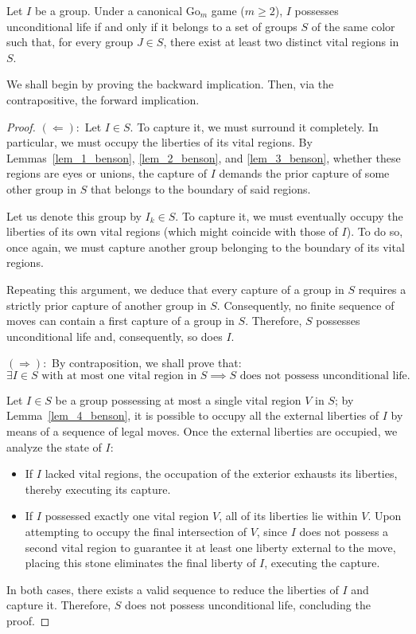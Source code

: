 \begin{theorem}\label{teo_benson}
	Let \(I\) be a group. Under a canonical \(\mathrm{Go}_{m}\) game (\(m \geq 2\)), \(I\) possesses unconditional life if and only if it belongs to a set of groups \(S\) of the same color such that, for every group \(J \in S\), there exist at least two distinct vital regions in \(S\).
\end{theorem}
We shall begin by proving the backward implication. Then, via the contrapositive, the forward implication.
\begin{proof}
	\((\Leftarrow):\) Let \(I\in S\). To capture it, we must surround it completely. In particular, we must occupy the liberties of its vital regions. By Lemmas~\ref{lem_1_benson}, \ref{lem_2_benson}, and \ref{lem_3_benson}, whether these regions are eyes or unions, the capture of \(I\) demands the prior capture of some other group in \(S\) that belongs to the boundary of said regions.
	
	Let us denote this group by \(I_k \in S\). To capture it, we must eventually occupy the liberties of its own vital regions (which might coincide with those of \(I\)). To do so, once again, we must capture another group belonging to the boundary of its vital regions.
	
	Repeating this argument, we deduce that every capture of a group in \(S\) requires a strictly prior capture of another group in \(S\). Consequently, no finite sequence of moves can contain a first capture of a group in \(S\). Therefore, \(S\) possesses unconditional life and, consequently, so does \(I\).

	
	\((\Rightarrow):\) By contraposition, we shall prove that:
	$$\exists I \in S \text{ with at most one vital region in } S \implies S \text{ does not possess unconditional life.}$$
	
	Let \(I \in S\) be a group possessing at most a single vital region \(V\) in \(S\); by Lemma~\ref{lem_4_benson}, it is possible to occupy all the external liberties of \(I\) by means of a sequence of legal moves. Once the external liberties are occupied, we analyze the state of \(I\):
	\begin{itemize}
		\item If \(I\) lacked vital regions, the occupation of the exterior exhausts its liberties, thereby executing its capture.
		\item If \(I\) possessed exactly one vital region \(V\), all of its liberties lie within \(V\). Upon attempting to occupy the final intersection of \(V\), since \(I\) does not possess a second vital region to guarantee it at least one liberty external to the move, placing this stone eliminates the final liberty of \(I\), executing the capture.
	\end{itemize}
	In both cases, there exists a valid sequence to reduce the liberties of \(I\) and capture it. Therefore, \(S\) does not possess unconditional life, concluding the proof.
\end{proof}

